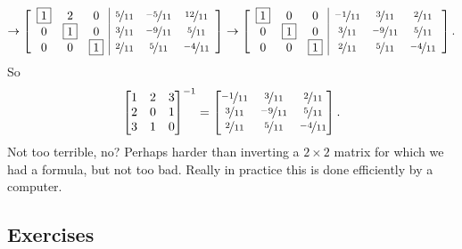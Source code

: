 \begin{equation*}
\to
\left[
\begin{array}{ccc|ccc}
\boxed{1} & 2 & 0 & \nicefrac{5}{11} & \nicefrac{-5}{11} & \nicefrac{12}{11} \\
0 & \boxed{1} & 0 & \nicefrac{3}{11} & \nicefrac{-9}{11} & \nicefrac{5}{11} \\
0 & 0 & \boxed{1} & \nicefrac{2}{11} & \nicefrac{5}{11} & \nicefrac{-4}{11}
\end{array}
\right]
\to
\left[
\begin{array}{ccc|ccc}
\boxed{1} & 0 & 0 & \nicefrac{-1}{11} & \nicefrac{3}{11} & \nicefrac{2}{11} \\
0 & \boxed{1} & 0 & \nicefrac{3}{11} & \nicefrac{-9}{11} & \nicefrac{5}{11} \\
0 & 0 & \boxed{1} & \nicefrac{2}{11} & \nicefrac{5}{11} & \nicefrac{-4}{11}
\end{array}
\right] .
\end{equation*}
So
\begin{equation*}
{\begin{bmatrix}
1 & 2 & 3 \\
2 & 0 & 1 \\
3 & 1 & 0
\end{bmatrix}}^{-1}
=
\begin{bmatrix}
\nicefrac{-1}{11} & \nicefrac{3}{11} & \nicefrac{2}{11} \\
\nicefrac{3}{11} & \nicefrac{-9}{11} & \nicefrac{5}{11} \\
\nicefrac{2}{11} & \nicefrac{5}{11} & \nicefrac{-4}{11}
\end{bmatrix} .
\end{equation*}
Not too terrible, no?  Perhaps harder than inverting a $2 \times 2$ matrix
for which we had a formula, but not too bad.  Really in practice this 
is done efficiently by a computer.

\subsection{Exercises}

